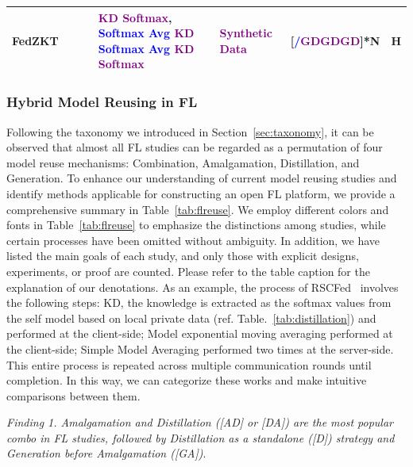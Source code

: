 \begin{table}[htp]
\begin{longtable}{|p{1.68cm}|p{1.2cm}|p{1.25cm}|p{5.0cm}|p{2.59cm}|p{1.2cm}|p{0.35cm}|}
    FedZKT~\cite{zhang2022fedzkt} & & &\textcolor{purple}{KD} \textcolor{purple}{\textbf{Softmax}}, \textcolor{blue}{\textbf{Softmax Avg}} \textcolor{purple}{KD} \textcolor{blue}{\textbf{Softmax Avg}} \textcolor{purple}{KD} \textcolor{purple}{\textbf{Softmax}} & \textcolor{purple}{\textbf{Synthetic Data}} & [\textcolor{blue}{/}\textcolor{purple}{GDGDGD}]*N & H \\ \hline

  \end{longtable}
\end{table}

\subsubsection{Hybrid Model Reusing in FL}
\label{sec:hybrid}
Following the taxonomy we introduced in Section~\ref{sec:taxonomy}, it can be observed that almost all FL studies can be regarded as a permutation of four model reuse mechanisms: Combination, Amalgamation, Distillation, and Generation.
To enhance our understanding of current model reusing studies and identify methods applicable for constructing an open FL platform, we provide a comprehensive summary in Table~\ref{tab:flreuse}. 
We employ different colors and fonts in Table~\ref{tab:flreuse} to emphasize the distinctions among studies, while certain processes have been omitted without ambiguity.
In addition, we have listed the main goals of each study, and only those with explicit designs, experiments, or proof are counted.
Please refer to the table caption for the explanation of our denotations.
As an example, the process of RSCFed~\cite{liang2022rscfed} involves the following steps: 
 KD, the knowledge is extracted as the softmax values from the self model based on local private data (ref. Table.~\ref{tab:distillation}) and performed at the client-side;
 Model exponential moving averaging performed at the client-side;
 Simple Model Averaging performed two times at the server-side.
This entire process is repeated across multiple communication rounds until completion.
In this way, we can categorize these works and make intuitive comparisons between them.


\textit{Finding 1. Amalgamation and Distillation ([AD] or [DA]) are the most popular combo in FL studies, followed by Distillation as a standalone ([D]) strategy and Generation before Amalgamation ([GA])}.

